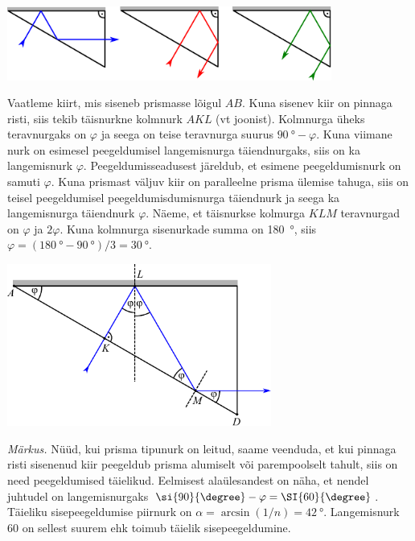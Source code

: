 {\begin{center}
 \includegraphics[width=0.8\textwidth]{2014-v3g-04-periskoopprillid_lahendus_joonis1.pdf}
\end{center}

\osa Vaatleme kiirt, mis siseneb prismasse lõigul $AB$. Kuna sisenev kiir on pinnaga risti, siis tekib täisnurkne kolmnurk $AKL$ (vt joonist). Kolmnurga üheks teravnurgaks on $\varphi$ ja seega on teise teravnurga suurus $\SI{90}{\degree}-\varphi$. Kuna viimane nurk on esimesel peegeldumisel langemisnurga täiendnurgaks, siis on ka langemisnurk $\varphi$. Peegeldumisseadusest järeldub, et esimene peegeldumisnurk on samuti $\varphi$. Kuna prismast väljuv kiir on paralleelne prisma ülemise tahuga, siis on teisel peegeldumisel peegeldumisdumisnurga täiendnurk ja seega ka langemisnurga täiendnurk $\varphi$. Näeme, et täisnurkse kolmurga $KLM$ teravnurgad on $\varphi$ ja $2\varphi$. Kuna kolmnurga sisenurkade summa on \SI{180}{\degree}, siis $\varphi=(\SI{180}{\degree}-\SI{90}{\degree})/3=\SI{30}{\degree}$.

\begin{center}
 \includegraphics[width=0.65\textwidth]{2014-v3g-04-periskoopprillid_lahendus_joonis2.pdf}
\end{center}

\emph{Märkus.} Nüüd, kui prisma tipunurk on leitud, saame veenduda, et kui pinnaga risti sisenenud kiir peegeldub prisma alumiselt või parempoolselt tahult, siis on need peegeldumised täielikud. Eelmisest alaülesandest on näha, et nendel juhtudel on langemisnurgaks $\si{90}{\degree}-\varphi=\SI{60}{\degree}$. Täieliku sisepeegeldumise piirnurk on $\alpha=\arcsin(1/n)=\SI{42}{\degree}$. Langemisnurk \si{60}{\degree} on sellest suurem ehk toimub täielik sisepeegeldumine.

}
